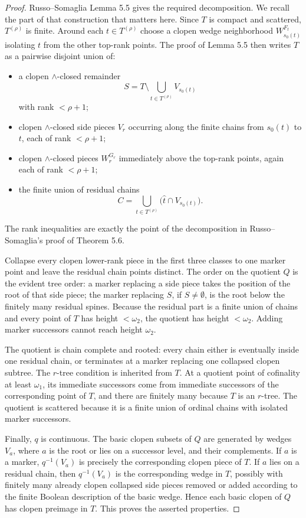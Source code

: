 \documentclass[11pt]{article}
\begin{document}
\begin{proof}
Russo--Somaglia Lemma 5.5 gives the required decomposition.  We recall the
part of that construction that matters here.  Since \(T\) is compact and
scattered, \(T^{(\rho)}\) is finite.  Around each \(t\in T^{(\rho)}\) choose
a clopen wedge neighborhood \(W_{s_0(t)}^{F_t}\) isolating \(t\) from the
other top-rank points.  The proof of Lemma 5.5 then writes \(T\) as a
pairwise disjoint union of:
\begin{itemize}
\item a clopen \(\wedge\)-closed remainder
\[
S=T\setminus \bigcup_{t\in T^{(\rho)}}V_{s_0(t)}
\]
with rank \(<\rho+1\);
\item clopen \(\wedge\)-closed side pieces \(V_r\) occurring along the finite
chains from \(s_0(t)\) to \(t\), each of rank \(<\rho+1\);
\item clopen \(\wedge\)-closed pieces \(W_r^{G_r}\) immediately above the
top-rank points, again each of rank \(<\rho+1\);
\item the finite union of residual chains
\[
C=\bigcup_{t\in T^{(\rho)}}\bigl(\hat t\cap V_{s_0(t)}\bigr).
\]
\end{itemize}
The rank inequalities are exactly the point of the decomposition in
Russo--Somaglia's proof of Theorem 5.6.

Collapse every clopen lower-rank piece in the first three classes to one
marker point and leave the residual chain points distinct.  The order on the
quotient \(Q\) is the evident tree order: a marker replacing a side piece
takes the position of the root of that side piece; the marker replacing
\(S\), if \(S\neq\emptyset\), is the root below the finitely many residual
spines.  Because the residual part is a finite union of chains and every
point of \(T\) has height \(<\omega_2\), the quotient has height
\(<\omega_2\).  Adding marker successors cannot reach height \(\omega_2\).

The quotient is chain complete and rooted: every chain either is eventually
inside one residual chain, or terminates at a marker replacing one collapsed
clopen subtree.  The \(r\)-tree condition is inherited from \(T\).  At a
quotient point of cofinality at least \(\omega_1\), its immediate successors
come from immediate successors of the corresponding point of \(T\), and there
are finitely many because \(T\) is an \(r\)-tree.  The quotient is scattered
because it is a finite union of ordinal chains with isolated marker
successors.

Finally, \(q\) is continuous.  The basic clopen subsets of \(Q\) are generated
by wedges \(V_a\), where \(a\) is the root or lies on a successor level, and
their complements.  If \(a\) is a marker, \(q^{-1}(V_a)\) is precisely the
corresponding clopen piece of \(T\).  If \(a\) lies on a residual chain, then
\(q^{-1}(V_a)\) is the corresponding wedge in \(T\), possibly with finitely
many already clopen collapsed side pieces removed or added according to the
finite Boolean description of the basic wedge.  Hence each basic clopen of
\(Q\) has clopen preimage in \(T\).  This proves the asserted properties.
\end{proof}
\end{document}
